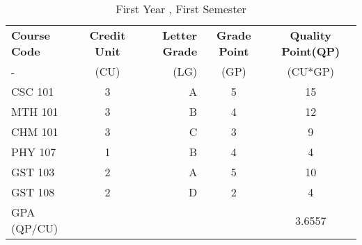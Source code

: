 \documentclass{article}
\begin{document}
	\begin{table}[h!]
		\begin{center}
		\caption{First Year , First Semester}
		\label{tab:table1}
		\begin{tabular}{l|c|r|c|c}
			\textbf{Course Code} & \textbf{Credit Unit} & \textbf{Letter Grade} & \textbf{Grade Point} & \textbf{Quality Point(QP)}\\
			- & (CU) & (LG) & (GP) & (CU*GP) \\
			\hline
			CSC 101 & 3 & A & 5 & 15\\ 
			MTH 101 & 3 & B & 4 & 12\\
			CHM 101 & 3 & C & 3 & 9\\
			PHY 107 & 1 & B & 4 & 4\\
			GST 103 & 2 & A & 5 & 10\\
			GST 108 & 2 & D & 2 & 4\\
			GPA (QP/CU) & & &   & 3.6557\\
		\end{tabular}
	\end{center}
	\end{table}
\end{document}

